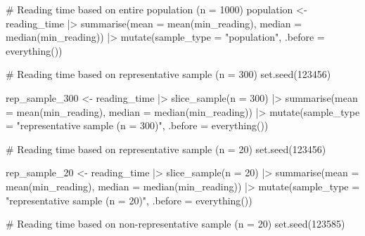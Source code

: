 \documentclass[
  letterpaper,
]{krantz}
\makeatletter
\newenvironment{Shaded}{\begin{snugshade}}{\end{snugshade}}
\newcommand{\AttributeTok}[1]{\textcolor[rgb]{0.40,0.45,0.13}{#1}}
\newcommand{\CommentTok}[1]{\textcolor[rgb]{0.37,0.37,0.37}{#1}}
\newcommand{\DecValTok}[1]{\textcolor[rgb]{0.68,0.00,0.00}{#1}}
\newcommand{\FunctionTok}[1]{\textcolor[rgb]{0.28,0.35,0.67}{#1}}
\newcommand{\NormalTok}[1]{\textcolor[rgb]{0.00,0.23,0.31}{#1}}
\newcommand{\OtherTok}[1]{\textcolor[rgb]{0.00,0.23,0.31}{#1}}
\newcommand{\SpecialCharTok}[1]{\textcolor[rgb]{0.37,0.37,0.37}{#1}}
\newcommand{\StringTok}[1]{\textcolor[rgb]{0.13,0.47,0.30}{#1}}
\newenvironment{kframe}{%
\medskip{}
\setlength{\fboxsep}{.8em}
 \def\at@end@of@kframe{}%
 \ifinner\ifhmode%
  \def\at@end@of@kframe{\end{minipage}}%
  \begin{minipage}{\columnwidth}%
 \fi\fi%
 \def\FrameCommand##1{\hskip\@totalleftmargin \hskip-\fboxsep
 \colorbox{shadecolor}{##1}\hskip-\fboxsep
     \hskip-\linewidth \hskip-\@totalleftmargin \hskip\columnwidth}%
 \MakeFramed {\advance\hsize-\width
   \@totalleftmargin\z@ \linewidth\hsize
   \@setminipage}}%
 {\par\unskip\endMakeFramed%
 \at@end@of@kframe}
\renewenvironment{Shaded}{\begin{kframe}}{\end{kframe}}
\makeatother
\begin{document}
\begin{Shaded}
\begin{Highlighting}[]
\CommentTok{\# Reading time based on entire population (n = 1000)}
\NormalTok{population }\OtherTok{\textless{}{-}}\NormalTok{ reading\_time }\SpecialCharTok{|\textgreater{}}
  \FunctionTok{summarise}\NormalTok{(}\AttributeTok{mean =} \FunctionTok{mean}\NormalTok{(min\_reading),}
            \AttributeTok{median =} \FunctionTok{median}\NormalTok{(min\_reading)) }\SpecialCharTok{|\textgreater{}}
  \FunctionTok{mutate}\NormalTok{(}\AttributeTok{sample\_type =} \StringTok{"population"}\NormalTok{,}
         \AttributeTok{.before =} \FunctionTok{everything}\NormalTok{())}


\CommentTok{\# Reading time based on representative sample (n = 300)}
\FunctionTok{set.seed}\NormalTok{(}\DecValTok{123456}\NormalTok{)}

\NormalTok{rep\_sample\_300 }\OtherTok{\textless{}{-}}
\NormalTok{  reading\_time }\SpecialCharTok{|\textgreater{}}
  \FunctionTok{slice\_sample}\NormalTok{(}\AttributeTok{n =} \DecValTok{300}\NormalTok{) }\SpecialCharTok{|\textgreater{}}
  \FunctionTok{summarise}\NormalTok{(}\AttributeTok{mean =} \FunctionTok{mean}\NormalTok{(min\_reading),}
            \AttributeTok{median =} \FunctionTok{median}\NormalTok{(min\_reading)) }\SpecialCharTok{|\textgreater{}}
  \FunctionTok{mutate}\NormalTok{(}\AttributeTok{sample\_type =} \StringTok{"representative sample (n = 300)"}\NormalTok{, }\AttributeTok{.before =} \FunctionTok{everything}\NormalTok{())}

\CommentTok{\# Reading time based on representative sample (n = 20)}
\FunctionTok{set.seed}\NormalTok{(}\DecValTok{123456}\NormalTok{)}

\NormalTok{rep\_sample\_20 }\OtherTok{\textless{}{-}}
\NormalTok{  reading\_time }\SpecialCharTok{|\textgreater{}}
  \FunctionTok{slice\_sample}\NormalTok{(}\AttributeTok{n =} \DecValTok{20}\NormalTok{) }\SpecialCharTok{|\textgreater{}}
  \FunctionTok{summarise}\NormalTok{(}\AttributeTok{mean =} \FunctionTok{mean}\NormalTok{(min\_reading),}
            \AttributeTok{median =} \FunctionTok{median}\NormalTok{(min\_reading)) }\SpecialCharTok{|\textgreater{}}
  \FunctionTok{mutate}\NormalTok{(}\AttributeTok{sample\_type =} \StringTok{"representative sample (n = 20)"}\NormalTok{,}
         \AttributeTok{.before =} \FunctionTok{everything}\NormalTok{())}

\CommentTok{\# Reading time based on non{-}representative sample (n = 20)}
\FunctionTok{set.seed}\NormalTok{(}\DecValTok{123585}\NormalTok{)}


\end{Highlighting}
\end{Shaded}
\end{document}

